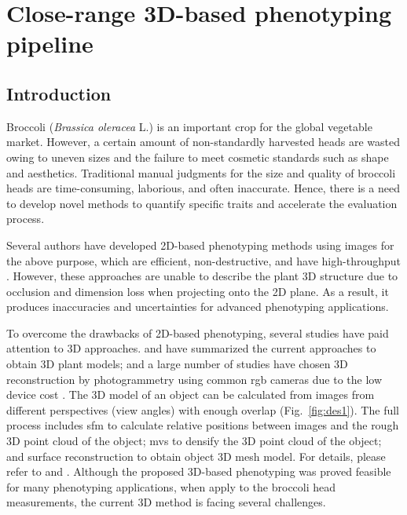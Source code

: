 \chapter{Close-range 3D-based phenotyping pipeline}

\section{Introduction}


Broccoli (\textit{Brassica oleracea} L.) is an important crop for the global vegetable market. However, a certain amount of non-standardly harvested heads are wasted owing to uneven sizes and the failure to meet cosmetic standards such as shape and aesthetics. Traditional manual judgments for the size and quality of broccoli heads are time-consuming, laborious, and often inaccurate. Hence, there is a need to develop novel methods to quantify specific traits and accelerate the evaluation process.

Several authors have developed 2D-based phenotyping methods using images for the above purpose, which are efficient, non-destructive, and have high-throughput \citep{yang_greenness_2015,guo_easypcc_2017,zou_broccoli_2019}. However, these approaches are unable to describe the plant 3D structure due to occlusion and dimension loss when projecting onto the 2D plane. As a result, it produces inaccuracies and uncertainties for advanced phenotyping applications.

To overcome the drawbacks of 2D-based phenotyping, several studies have paid attention to 3D approaches. \citet{paulus_measuring_2019} and \citet{kochi_introduction_2021} have summarized the current approaches to obtain 3D plant models; and a large number of studies have chosen 3D reconstruction by photogrammetry using common \gls{rgb} cameras due to the low device cost \citep{xiao_estimating_2021,zermas_3d_2020,zhang_estimating_2016}. The 3D model of an object can be calculated from images from different perspectives (view angles) with enough overlap (Fig.~\ref{fig:des1}). The full process includes \gls{sfm} to calculate relative positions between images and the rough 3D point cloud of the object; \gls{mvs} to densify the 3D point cloud of the object; and surface reconstruction to obtain object 3D mesh model. For details, please refer to \citet{hartley_multiple_2003} and \citet{snavely_scene_2010}. Although the proposed 3D-based phenotyping was proved feasible for many phenotyping applications, when apply to the broccoli head measurements, the current 3D method is facing several challenges.

